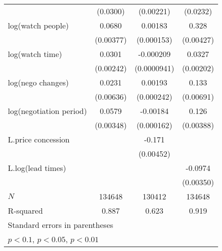 {\begin{tabular}{l*{3}{c}}
            &    (0.0300)         &   (0.00221)         &    (0.0232)         \\
\addlinespace
log(watch people)&      0.0680\sym{***}&     0.00183\sym{***}&       0.328\sym{***}\\
            &   (0.00377)         &  (0.000153)         &   (0.00427)         \\
\addlinespace
log(watch time)&      0.0301\sym{***}&   -0.000209\sym{**} &      0.0327\sym{***}\\
            &   (0.00242)         & (0.0000941)         &   (0.00202)         \\
\addlinespace
log(nego changes)&      0.0231\sym{***}&     0.00193\sym{***}&       0.133\sym{***}\\
            &   (0.00636)         &  (0.000242)         &   (0.00691)         \\
\addlinespace
log(negotiation period)&      0.0579\sym{***}&    -0.00184\sym{***}&       0.126\sym{***}\\
            &   (0.00348)         &  (0.000162)         &   (0.00388)         \\
\addlinespace
L.price concession&                     &      -0.171\sym{***}&                     \\
            &                     &   (0.00452)         &                     \\
\addlinespace
L.log(lead times)   &                     &                     &     -0.0974\sym{***}\\
            &                     &                     &   (0.00350)         \\
\midrule
\(N\)       &      134648         &      130412         &      134648         \\
R-squared   &       0.887         &       0.623         &       0.919         \\
\bottomrule
\multicolumn{4}{l}{\footnotesize Standard errors in parentheses}\\
\multicolumn{4}{l}{\footnotesize \sym{*} \(p<0.1\), \sym{**} \(p<0.05\), \sym{***} \(p<0.01\)}\\
\end{tabular}
}
